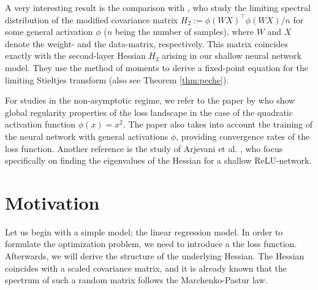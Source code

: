 \documentclass{article}
\begin{document}
\par
A very interesting result is the comparison with \cite{benigni, piccolo}, who study the limiting spectral distribution of the modified covariance matrix $H_2:=\phi(WX)^\top\phi(WX)/n$ for some general activation $\phi$ ($n$ being the number of samples), where $W$ and $X$ denote the weight- and the data-matrix, respectively. This matrix coincides exactly with the second-layer Hessian $H_2$ arising in our shallow neural network model. They use the method of moments to derive a fixed-point equation for the limiting Stieltjes transform (also see Theorem \ref{thm:peche}).
\bigskip
\par
For studies in the non-asymptotic regime, we refer to the paper by \cite{soltanolkotabi} who show global regularity properties of the loss landscape in the case of the quadratic activation function $\phi(x)=x^2$. The paper also takes into account the training of the neural network with general activations $\phi$, providing convergence rates of the loss function. Another reference is the study of Arjevani et al. \cite{arjevani}, who focus specifically on finding the eigenvalues of the Hessian for a shallow ReLU-network.


\section{Motivation}
Let us begin with a simple model; the linear regression model. In order to formulate the optimization problem, we need to introduce a the loss function. Afterwards, we will derive the structure of the underlying Hessian. The Hessian coincides with a scaled covariance matrix, and it is already known that the spectrum of such a random matrix follows the Marchenko-Pastur law.
\end{document}
